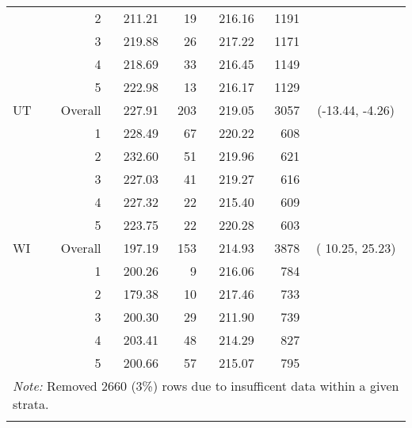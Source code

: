 \begin{longtable}{lrrr@{\extracolsep{.25cm}}rrc}
   & 2 & 211.21 &  19 & 216.16 & 1191 &  \\ 
   & 3 & 219.88 &  26 & 217.22 & 1171 &  \\ 
   & 4 & 218.69 &  33 & 216.45 & 1149 &  \\ 
   & 5 & 222.98 &  13 & 216.17 & 1129 &  \\ 
   \hline
UT & Overall & 227.91 & 203 & 219.05 & 3057 & (-13.44,  -4.26) \\ 
   & 1 & 228.49 &  67 & 220.22 & 608 &  \\ 
   & 2 & 232.60 &  51 & 219.96 & 621 &  \\ 
   & 3 & 227.03 &  41 & 219.27 & 616 &  \\ 
   & 4 & 227.32 &  22 & 215.40 & 609 &  \\ 
   & 5 & 223.75 &  22 & 220.28 & 603 &  \\ 
   \hline
WI & Overall & 197.19 & 153 & 214.93 & 3878 & ( 10.25,  25.23) \\ 
   & 1 & 200.26 &   9 & 216.06 & 784 &  \\ 
   & 2 & 179.38 &  10 & 217.46 & 733 &  \\ 
   & 3 & 200.30 &  29 & 211.90 & 739 &  \\ 
   & 4 & 203.41 &  48 & 214.29 & 827 &  \\ 
   & 5 & 200.66 &  57 & 215.07 & 795 &  \\ 
   \hline \multicolumn{7}{l}{\textit{Note:} Removed 2660 (3\%) rows due to insufficent data within a given strata.} \\\hline
\label{g4read-mlpsa-lrAIC}
\end{longtable}
